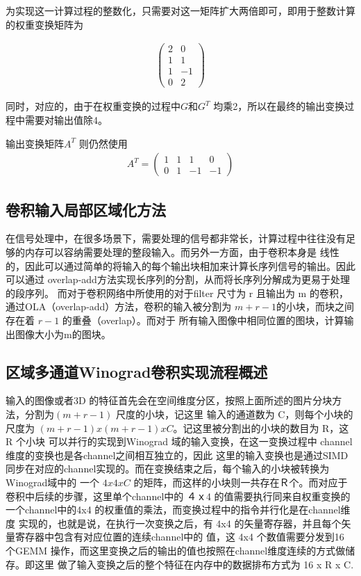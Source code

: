 为实现这一计算过程的整数化，只需要对这一矩阵扩大两倍即可，即用于整数计算的权重变换矩阵为

\begin{align}
  \begin{pmatrix}
    2 & 0\\
    1 & 1\\
    1 & -1\\
    0 & 2
  \end{pmatrix}
\end{align}

同时，对应的，由于在权重变换的过程中$G $和$G^T $ 均乘2，所以在最终的输出变换过程中需要对输出值除4。

输出变换矩阵$A^T$ 则仍然使用
\begin{align}
  A^T = 
  \begin{pmatrix}
    1 & 1 & 1 & 0 \\
    0 & 1 & -1 & -1
  \end{pmatrix}
\end{align}


\subsection{卷积输入局部区域化方法}
在信号处理中，在很多场景下，需要处理的信号都非常长，计算过程中往往没有足够的内存可以容纳需要处理的整段输入。而另外一方面，由于卷积本身是
线性的，因此可以通过简单的将输入的每个输出块相加来计算长序列信号的输出。因此可以通过 overlap-add方法实现长序列的分割，从而将长序列分解成为更易于处理的段序列。
而对于卷积网络中所使用的对于filter 尺寸为 r 且输出为 m 的卷积，通过OLA（overlap-add）方法，卷积的输入被分割为 $m + r - 1$的小块，而块之间存在着 $r-1$ 的重叠（overlap）。而对于
所有输入图像中相同位置的图块，计算输出图像大小为m的图块。


\subsection{区域多通道Winograd卷积实现流程概述}

输入的图像或者3D 的特征首先会在空间维度分区，按照上面所述的图片分块方法，分割为$(m+r-1)$ 尺度的小块，记这里
输入的通道数为 C，则每个小块的尺度为 $ (m+r-1) x (m+r-1) x C $。记这里被分割出的小块的数目为 R，这 R 个小块
可以并行的实现到Winograd 域的输入变换，在这一变换过程中 channel维度的变换也是各channel之间相互独立的，因此
这里的输入变换也是通过SIMD 同步在对应的channel实现的。而在变换结束之后，每个输入的小块被转换为Winograd域中的
一个 $ 4 x 4 x C $ 的矩阵，而这样的小块则一共存在Ｒ个。而对应于卷积中后续的步骤，这里单个channel中的
４ｘ4 的值需要执行同来自权重变换的 一个channel中的4x4 的权重值的乘法，而变换过程中的指令并行化是在channel维度
实现的，也就是说，在执行一次变换之后，有 4x4 的矢量寄存器，并且每个矢量寄存器中包含有对应位置的连续channel中的
值，这 4x4 个数值需要分发到16 个GEMM 操作，而这里变换之后的输出的值也按照在channel维度连续的方式做储存。即这里
做了输入变换之后的整个特征在内存中的数据排布方式为 16 x R x C. 

